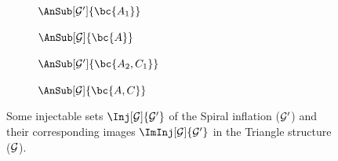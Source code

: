 \documentclass[aps, 10pt, english, twoside, pra, nofootinbib, tightenlines, longbibliography, superscriptaddress]{revtex4-1}
\begin{document}
    \begin{nscenter}
    \begin{figure}
    \begin{subfigure}[b]{.23\linewidth}
    \scalebox{0.8}{}
    \caption{$\AnSub[\graph']{\bc{A_1}}$}\label{fig:spiral_inflation_inj1}
    \end{subfigure}
    \begin{subfigure}[b]{.23\linewidth}
    \scalebox{0.8}{}
    \caption{$\AnSub[\graph]{\bc{A}}$}\label{fig:spiral_inflation_iminj1}
    \end{subfigure}
    \begin{subfigure}[b]{.23\linewidth}
    \scalebox{0.8}{}
    \caption{$\AnSub[\graph']{\bc{A_2, C_1}}$}\label{fig:spiral_inflation_inj2}
    \end{subfigure}
    \begin{subfigure}[b]{.23\linewidth}
    \scalebox{0.8}{}
    \caption{$\AnSub[\graph]{\bc{A,C}}$}\label{fig:spiral_inflation_iminj2}
    \end{subfigure}
    \caption{Some injectable sets $\Inj[\graph]{\graph'}$ of the Spiral inflation ($\mathcal{G}'$) and their corresponding images $\ImInj[\graph]{\graph'}$ in the Triangle structure ($\mathcal{G}$).}
    \label{fig:injectablesets}
    \end{figure}
    \end{nscenter}
\end{document}
